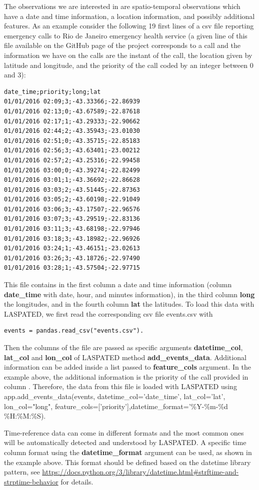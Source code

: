 \documentclass[article]{jss}
\begin{document}
{The observations we are interested in are spatio-temporal observations which have a date and time information, a location information, and possibly additional features.
As an example consider the following 19 first lines of a csv file reporting emergency calls to Rio de Janeiro emergency health service (a given line of this file available on the GitHub page of the project corresponds to a call and the information we have on the calls are the instant of the call, the location given by latitude and longitude, and the priority of the call coded by an integer between 0 and 3):
\begin{verbatim}
date_time;priority;long;lat
01/01/2016 02:09;3;-43.33366;-22.86939
01/01/2016 02:13;0;-43.67589;-22.87618
01/01/2016 02:17;1;-43.29333;-22.90662
01/01/2016 02:44;2;-43.35943;-23.01030
01/01/2016 02:51;0;-43.35715;-22.85183
01/01/2016 02:56;3;-43.63401;-23.00212
01/01/2016 02:57;2;-43.25316;-22.99458
01/01/2016 03:00;0;-43.39274;-22.82499
01/01/2016 03:01;1;-43.36692;-22.86628
01/01/2016 03:03;2;-43.51445;-22.87363
01/01/2016 03:05;2;-43.60198;-22.91049
01/01/2016 03:06;3;-43.17507;-22.96576
01/01/2016 03:07;3;-43.29519;-22.83136
01/01/2016 03:11;3;-43.68198;-22.97946
01/01/2016 03:18;3;-43.18982;-22.96926
01/01/2016 03:24;1;-43.46151;-23.02613
01/01/2016 03:26;3;-43.18726;-22.97490
01/01/2016 03:28;1;-43.57504;-22.97715   
\end{verbatim}
This file contains in the first column a date and time information (column {\textbf{date\_time}} with date, hour, and minutes information), in the third column {\textbf{long}} the longitudes, and in the fourth column {\textbf{lat}} the latitudes.
To load this data with LASPATED, we first read the corresponding csv file events.csv with
\begin{verbatim}
events = pandas.read_csv("events.csv").
\end{verbatim}
Then the columns of the file are passed as specific arguments \textbf{datetime\_col}, \textbf{lat\_col} and \textbf{lon\_col} of LASPATED method {\textbf{add\_events\_data}}.
Additional information can be added inside a list passed to \textbf{feature\_cols} argument.
In the example above, the additional information is the priority of the call provided in column {}.
Therefore, the data from this file is loaded with LASPATED using app.add\_events\_data(events, datetime\_col='date\_time', lat\_col='lat', lon\_col="long", feature\_cols=['priority'],datetime\_format='\%Y-\%m-\%d \%H:\%M:\%S).

Time-reference data can come in different formats and the most common ones will be automatically detected and understood by LASPATED.
A specific time column format using the \textbf{datetime\_format} argument can be used, as shown in the example above.
This format should be defined based on the datetime library pattern, see \url{https://docs.python.org/3/library/datetime.html#strftime-and-strptime-behavior} for details.

}
\end{document}

